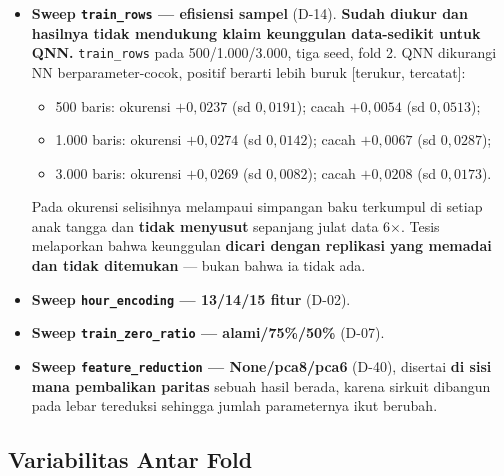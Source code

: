 \begin{itemize}
    \item \textbf{Sweep \texttt{train\_rows} --- efisiensi sampel} (D-14).
          \textbf{Sudah diukur dan hasilnya tidak mendukung klaim keunggulan
          data-sedikit untuk QNN.} \texttt{train\_rows} pada 500/1.000/3.000,
          tiga seed, fold 2. QNN dikurangi NN berparameter-cocok, positif
          berarti lebih buruk [terukur, tercatat]:
          \begin{itemize}
              \item 500 baris: okurensi $+0,0237$ (sd $0,0191$); cacah
                    $+0,0054$ (sd $0,0513$);
              \item 1.000 baris: okurensi $+0,0274$ (sd $0,0142$); cacah
                    $+0,0067$ (sd $0,0287$);
              \item 3.000 baris: okurensi $+0,0269$ (sd $0,0082$); cacah
                    $+0,0208$ (sd $0,0173$).
          \end{itemize}
          Pada okurensi selisihnya melampaui simpangan baku terkumpul di setiap
          anak tangga dan \textbf{tidak menyusut} sepanjang julat data 6$\times$.
          Tesis melaporkan bahwa keunggulan \textbf{dicari dengan replikasi yang
          memadai dan tidak ditemukan} --- bukan bahwa ia tidak ada.
    \item \textbf{Sweep \texttt{hour\_encoding} --- 13/14/15 fitur} (D-02).
    \item \textbf{Sweep \texttt{train\_zero\_ratio} --- alami/75\%/50\%} (D-07).
    \item \textbf{Sweep \texttt{feature\_reduction} --- None/pca8/pca6} (D-40),
          disertai \textbf{di sisi mana pembalikan paritas} sebuah hasil berada,
          karena sirkuit dibangun pada lebar tereduksi sehingga jumlah
          parameternya ikut berubah.
\end{itemize}

\subsection{Variabilitas Antar Fold}

